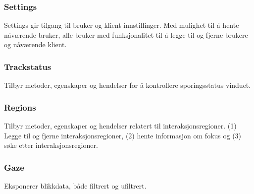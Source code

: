 \subsubsection{Settings}
Settings gir tilgang til bruker og klient innstillinger. Med mulighet til å hente nåværende bruker, alle bruker med funksjonalitet til å legge til og fjerne brukere og nåværende klient.

\subsubsection{Trackstatus}
Tilbyr metoder, egenskaper og hendelser for å kontrollere sporingsstatus vinduet. 


\subsubsection{Regions}
Tilbyr metoder, egenskaper og hendelser relatert til interaksjonsregioner. (1) Legge til og fjerne interaksjonsregioner, (2) hente informasjon om fokus og (3) søke etter interaksjonsregioner.

\subsubsection{Gaze}
Eksponerer blikkdata, både filtrert og ufiltrert. 
